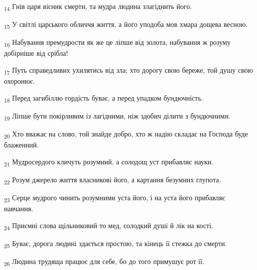 \begin{tcolorbox}
\textsubscript{14} Гнів царя вісник смерти, та мудра людина злагіднить його.
\end{tcolorbox}
\begin{tcolorbox}
\textsubscript{15} У світлі царського обличчя життя, а його уподоба мов хмара дощева весною.
\end{tcolorbox}
\begin{tcolorbox}
\textsubscript{16} Набування премудрости як же це ліпше від золота, набування ж розуму добірніше від срібла!
\end{tcolorbox}
\begin{tcolorbox}
\textsubscript{17} Путь справедливих ухилятись від зла; хто дорогу свою береже, той душу свою охоронює.
\end{tcolorbox}
\begin{tcolorbox}
\textsubscript{18} Перед загибіллю гордість буває, а перед упадком бундючність.
\end{tcolorbox}
\begin{tcolorbox}
\textsubscript{19} Ліпше бути покірливим із лагідними, ніж здобич ділити з бундючними.
\end{tcolorbox}
\begin{tcolorbox}
\textsubscript{20} Хто вважає на слово, той знайде добро, хто ж надію складає на Господа буде блаженний.
\end{tcolorbox}
\begin{tcolorbox}
\textsubscript{21} Мудросердого кличуть розумний, а солодощ уст прибавляє науки.
\end{tcolorbox}
\begin{tcolorbox}
\textsubscript{22} Розум джерело життя власникові його, а картання безумних глупота.
\end{tcolorbox}
\begin{tcolorbox}
\textsubscript{23} Серце мудрого чинить розумними уста його, і на уста його прибавляє навчання.
\end{tcolorbox}
\begin{tcolorbox}
\textsubscript{24} Приємні слова щільниковий то мед, солодкий душі й лік на кості.
\end{tcolorbox}
\begin{tcolorbox}
\textsubscript{25} Буває, дорога людині здається простою, та кінець її стежка до смерти.
\end{tcolorbox}
\begin{tcolorbox}
\textsubscript{26} Людина трудяща працює для себе, бо до того примушує рот її.
\end{tcolorbox}
